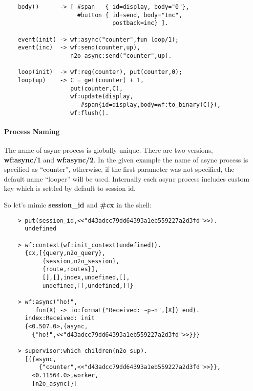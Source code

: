 \vspace{1\baselineskip}
\begin{lstlisting}
    body()      -> [ #span   { id=display, body="0"},
                     #button { id=send, body="Inc",
                               postback=inc} ].

    event(init) -> wf:async("counter",fun loop/1);
    event(inc)  -> wf:send(counter,up),
                   n2o_async:send("counter",up).

    loop(init)  -> wf:reg(counter), put(counter,0);
    loop(up)    -> C = get(counter) + 1,
                   put(counter,C),
                   wf:update(display,
                      #span{id=display,body=wf:to_binary(C)}),
                   wf:flush().
\end{lstlisting}
\vspace{1\baselineskip}

\paragraph{\bf Process Naming}
The name of async process is globally unique. There are two
versions, {\bf wf:async/1} and {\bf wf:async/2}. In the given example
the name of async process is specified as ``counter'', otherwise,
if the first parameter was not specified, the default name ``looper''
will be used. Internally each async process includes custom key which
is settled by default to session id.

\newpage
So let's mimic {\bf session\_id} and {\bf \#cx} in the shell:

\vspace{1\baselineskip}
\begin{lstlisting}
    > put(session_id,<<"d43adcc79dd64393a1eb559227a2d3fd">>).
      undefined

    > wf:context(wf:init_context(undefined)).
      {cx,[{query,n2o_query},
           {session,n2o_session},
           {route,routes}],
           [],[],index,undefined,[],
           undefined,[],undefined,[]}

    > wf:async("ho!",
         fun(X) -> io:format("Received: ~p~n",[X]) end).
      index:Received: init
      {<0.507.0>,{async,
        {"ho!",<<"d43adcc79dd64393a1eb559227a2d3fd">>}}}

    > supervisor:which_children(n2o_sup).
      [{{async,
          {"counter",<<"d43adcc79dd64393a1eb559227a2d3fd">>}},
        <0.11564.0>,worker,
        [n2o_async]}]
\end{lstlisting}
\vspace{1\baselineskip}


